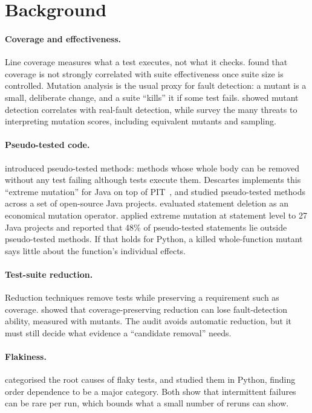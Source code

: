 \section{Background}

\paragraph{Coverage and effectiveness.} Line coverage measures what a test executes, not what it checks. \citet{inozemtseva2014coverage} found that coverage is not strongly correlated with suite effectiveness once suite size is controlled. Mutation analysis is the usual proxy for fault detection: a mutant is a small, deliberate change, and a suite ``kills'' it if some test fails. \citet{just2014mutants} showed mutant detection correlates with real-fault detection, while \citet{papadakis2019advances} survey the many threats to interpreting mutation scores, including equivalent mutants and sampling.

\paragraph{Pseudo-tested code.} \citet{niedermayr2016pseudo} introduced pseudo-tested methods: methods whose whole body can be removed without any test failing although tests execute them. Descartes implements this ``extreme mutation'' for Java on top of PIT~\cite{vera2018descartes}, and \citet{vera2019pseudo} studied pseudo-tested methods across a set of open-source Java projects. \citet{deng2013deletion} evaluated statement deletion as an economical mutation operator. \citet{maton2024pseudo} applied extreme mutation at statement level to 27 Java projects and reported that 48\% of pseudo-tested statements lie outside pseudo-tested methods. If that holds for Python, a killed whole-function mutant says little about the function's individual effects.

\paragraph{Test-suite reduction.} Reduction techniques remove tests while preserving a requirement such as coverage. \citet{shi2014reduction} showed that coverage-preserving reduction can lose fault-detection ability, measured with mutants. The audit avoids automatic reduction, but it must still decide what evidence a ``candidate removal'' needs.

\paragraph{Flakiness.} \citet{luo2014flaky} categorised the root causes of flaky tests, and \citet{gruber2021flaky} studied them in Python, finding order dependence to be a major category. Both show that intermittent failures can be rare per run, which bounds what a small number of reruns can show.

